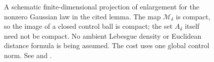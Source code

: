 \begin{figure}
  \centering
  
  \caption[Gaussian enlargement by an image of a Hilbert ball]{A schematic
    finite-dimensional projection of enlargement for the nonzero Gaussian law in
    the cited lemma. The map $\mathcal{M}_\delta$ is compact, so the image of a
    closed control ball is compact; the set $A_\delta$ itself need not be
    compact. No ambient Lebesgue density or Euclidean distance formula is being
    assumed. The cost uses one global control norm. See
     and
    .}
  \label{Fig:gaussian-enlargement}
\end{figure}
